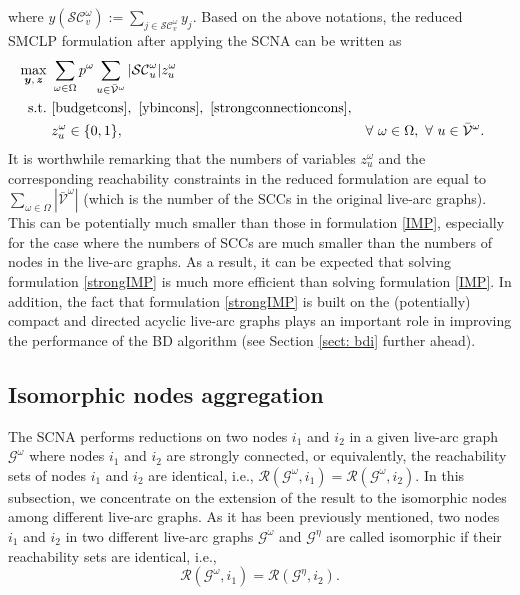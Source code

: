 \documentclass[a4paper,10pt]{article}
\theoremstyle{plain}
\newcommand{\revv}[1]{{#1}}
\begin{document}
	where $y(\mathcal{SC}_v^{\omega}) := \sum_{j \in \mathcal{SC}_v^{\omega}} y_j$.
	Based on the above notations, the reduced SMCLP formulation after applying the SCNA can be written as
	\begin{equation}\label{strongIMP}
		\begin{aligned}
			\max_{\boldsymbol{y},\,\boldsymbol{z}}\ & \sum_{\omega\in\Omega}p^{\omega}\sum_{u\in\bar{\mathcal{V}}^{\omega}}|\mathcal{SC}_u^{\omega}|z_{u}^{\omega} \\
			\hbox{s.t.}\ & 
			\eqref{budgetcons},~\eqref{ybincons},~\eqref{strongconnectioncons},\\
			& z_{u}^{\omega} \in \{0,1\} , && \forall ~\omega\in\Omega, ~\forall~ u\in \bar{\mathcal{V}}^{\omega}.
		\end{aligned}
	\end{equation}
	It is worthwhile remarking that the numbers of variables $z_u^\omega$ and the corresponding reachability constraints in the reduced formulation are equal to $\sum_{\omega \in \Omega} |\mathcal{\bar{V}}^\omega|$ (which is the number of the SCCs in the original live-arc graphs).
	This can be potentially much smaller than those in formulation \eqref{IMP}, especially for the case where the numbers of SCCs are much smaller than the numbers of nodes in the  live-arc graphs. 
	As a result, it can be expected that solving formulation \eqref{strongIMP}  is much more efficient than solving formulation \eqref{IMP}.
	In addition, the fact that formulation \eqref{strongIMP} is built on the (potentially) compact and directed acyclic live-arc graphs \revv{plays an important role} in improving the performance of the BD algorithm (see \revv{Section \ref{sect: bdi}} further ahead).
	
	
	\subsection{Isomorphic nodes aggregation}\label{sect: INA}
	The SCNA performs reductions on two nodes $i_1$ and $i_2$ in a given live-arc graph $\mathcal{G}^\omega$ where nodes $i_1$ and $i_2$ are strongly connected, or equivalently, the reachability sets of nodes $i_1$ and $i_2$ are identical, i.e.,  $\mathcal{R}(\mathcal{G}^{\omega},i_1)=\mathcal{R}(\mathcal{G}^{\omega},i_2)$.
	In this subsection, we concentrate on \revv{the extension of} the result to the {isomorphic} nodes among different live-arc graphs. 
	As it has been previously mentioned, two nodes $i_1$ and $i_2$ in two different live-arc graphs $\mathcal{G}^\omega$ and $\mathcal{G}^\eta$ are called isomorphic if their reachability sets are identical, i.e.,
	\begin{equation}\label{SCequalcondi_equation}
		\mathcal{R}(\mathcal{G}^{\omega},i_1)=\mathcal{R}(\mathcal{G}^{\eta},i_2).
	\end{equation}
	
\end{document}
